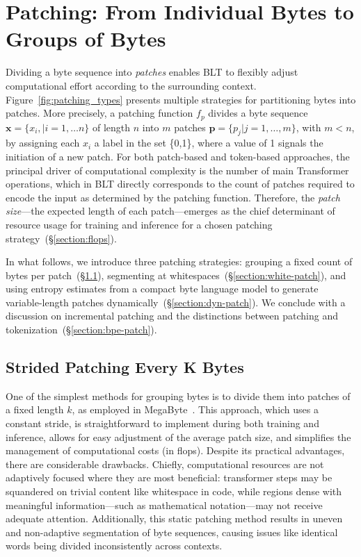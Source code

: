 \section{Patching: From Individual Bytes to Groups of Bytes}
\label{section:patching}

Dividing a byte sequence into \textit{patches} enables {\textsc BLT} to flexibly adjust computational effort according to the surrounding context. Figure~\ref{fig:patching_types} presents multiple strategies for partitioning bytes into patches. More precisely, a patching function $f_p$ divides a byte sequence $\pmb{x}=\{x_i,|i=1,\ldots n\}$ of length $n$ into $m$ patches $\pmb{p}=\{p_j|j=1,\ldots,m\}$, with $m < n$, by assigning each $x_i$ a label in the set \{0,1\}, where a value of 1 signals the initiation of a new patch. For both patch-based and token-based approaches, the principal driver of computational complexity is the number of main Transformer operations, which in {\textsc BLT} directly corresponds to the count of patches required to encode the input as determined by the patching function. Therefore, the \textit{patch size}—the expected length of each patch—emerges as the chief determinant of resource usage for training and inference for a chosen patching strategy~(\S\ref{section:flops}).

In what follows, we introduce three patching strategies: grouping a fixed count of bytes per patch~(\S\ref{section:static-patch}), segmenting at whitespaces~(\S\ref{section:white-patch}), and using entropy estimates from a compact byte language model to generate variable-length patches dynamically~(\S\ref{section:dyn-patch}). We conclude with a discussion on incremental patching and the distinctions between patching and tokenization~(\S\ref{section:bpe-patch}).

\subsection{Strided Patching Every K Bytes}
\label{section:static-patch}

One of the simplest methods for grouping bytes is to divide them into patches of a fixed length $k$, as employed in MegaByte~\citep{yu2023megabyte}. This approach, which uses a constant stride, is straightforward to implement during both training and inference, allows for easy adjustment of the average patch size, and simplifies the management of computational costs (in flops). Despite its practical advantages, there are considerable drawbacks. Chiefly, computational resources are not adaptively focused where they are most beneficial: transformer steps may be squandered on trivial content like whitespace in code, while regions dense with meaningful information—such as mathematical notation—may not receive adequate attention. Additionally, this static patching method results in uneven and non-adaptive segmentation of byte sequences, causing issues like identical words being divided inconsistently across contexts.

